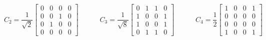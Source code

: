 \documentclass{amsart}
\newcommand{\bsm}       {\left[\begin{smallmatrix}}
\newcommand{\esm}       {\end{smallmatrix}\right]}
\renewcommand{\:}       {\colon}
\theoremstyle{definition}
\renewenvironment{solution}{\SolutionAtEnd}{\endSolutionAtEnd}
\begin{document}
\begin{solution}
{\[  \hspace{3em}
  C_2 = \frac{1}{\sqrt{2}} \bsm 0&0&0&0\\ 0&0&1&0\\ 0&1&0&0\\ 0&0&0&0\esm 
  \hspace{3em}
  C_3 = \frac{1}{\sqrt{8}} \bsm 0&1&1&0\\ 1&0&0&1\\ 1&0&0&1\\ 0&1&1&0\esm 
  \hspace{3em}
  C_4 = \frac{1}{2}        \bsm 1&0&0&1\\ 0&0&0&0\\ 0&0&0&0\\ 1&0&0&1\esm 
 \]}
\end{solution}
\end{document}
